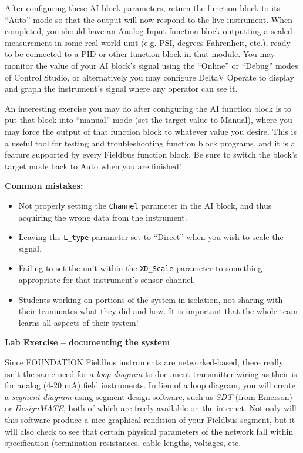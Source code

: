 After configuring these AI block parameters, return the function block to its ``Auto'' mode so that the output will now respond to the live instrument.  When completed, you should have an Analog Input function block outputting a scaled measurement in some real-world unit (e.g. PSI, degrees Fahrenheit, etc.), ready to be connected to a PID or other function block in that module.  You may monitor the value of your AI block's signal using the ``Online'' or ``Debug'' modes of Control Studio, or alternatively you may configure DeltaV Operate to display and graph the instrument's signal where any operator can see it.

\vskip 10pt

An interesting exercise you may do after configuring the AI function block is to put that block into ``manual'' mode (set the target value to Manual), where you may force the output of that function block to whatever value you desire.  This is a useful tool for testing and troubleshooting function block programs, and it is a feature supported by every Fieldbus function block.  Be sure to switch the block's target mode back to Auto when you are finished!

\vskip 10pt

{\bf Common mistakes:}

\begin{itemize}
\item{} Not properly setting the {\tt Channel} parameter in the AI block, and thus acquiring the wrong data from the instrument. 
\item{} Leaving the {\tt L\_type} parameter set to ``Direct'' when you wish to scale the signal.
\item{} Failing to set the unit within the {\tt XD\_Scale} parameter to something appropriate for that instrument's sensor channel.
\item{} Students working on portions of the system in isolation, not sharing with their teammates what they did and how.  It is important that the whole team learns all aspects of their system!
\end{itemize}





\vfil \eject

\noindent
{\bf Lab Exercise -- documenting the system}

\vskip 5pt

Since FOUNDATION Fieldbus instruments are networked-based, there really isn't the same need for a {\it loop diagram} to document transmitter wiring as their is for analog (4-20 mA) field instruments.  In lieu of a loop diagram, you will create a {\it segment diagram} using segment design software, such as {\it SDT} (from Emerson) or {\it DesignMATE}, both of which are freely available on the internet.  Not only will this software produce a nice graphical rendition of your Fieldbus segment, but it will also check to see that certain physical parameters of the network fall within specification (termination resistances, cable lengths, voltages, etc.

